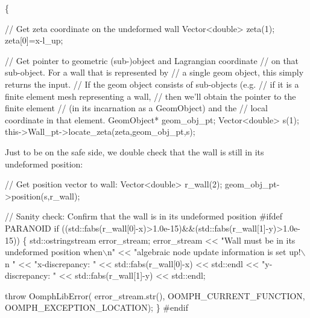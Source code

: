 \begin{DoxyCodeInclude}
    \{

     \textcolor{comment}{// Get zeta coordinate on the undeformed wall}
     Vector<double> zeta(1);
     zeta[0]=x-l\_up;

     \textcolor{comment}{// Get pointer to geometric (sub-)object and Lagrangian coordinate}
     \textcolor{comment}{// on that sub-object. For a wall that is represented by }
     \textcolor{comment}{// a single geom object, this simply returns the input.}
     \textcolor{comment}{// If the geom object consists of sub-objects (e.g. }
     \textcolor{comment}{// if it is a finite element mesh representing a wall,}
     \textcolor{comment}{// then we'll obtain the pointer to the finite element}
     \textcolor{comment}{// (in its incarnation as a GeomObject) and the}
     \textcolor{comment}{// local coordinate in that element.}
     GeomObject* geom\_obj\_pt;
     Vector<double> s(1);
     this->Wall\_pt->locate\_zeta(zeta,geom\_obj\_pt,s);

\end{DoxyCodeInclude}


Just to be on the safe side, we double check that the wall is still in its undeformed position\+:


\begin{DoxyCodeInclude}

     \textcolor{comment}{// Get position vector to wall:}
     Vector<double> r\_wall(2);
     geom\_obj\_pt->position(s,r\_wall);

     \textcolor{comment}{// Sanity check: Confirm that the wall is in its undeformed position}
\textcolor{preprocessor}{#ifdef PARANOID}
     \textcolor{keywordflow}{if} ((std::fabs(r\_wall[0]-x)>1.0e-15)&&(std::fabs(r\_wall[1]-y)>1.0e-15))
      \{
       std::ostringstream error\_stream;
       error\_stream 
        << \textcolor{stringliteral}{"Wall must be in its undeformed position when\(\backslash\)n"}
        << \textcolor{stringliteral}{"algebraic node update information is set up!\(\backslash\)n "}
        << \textcolor{stringliteral}{"x-discrepancy: "} << std::fabs(r\_wall[0]-x) << std::endl
        << \textcolor{stringliteral}{"y-discrepancy: "} << std::fabs(r\_wall[1]-y) << std::endl;
       
       \textcolor{keywordflow}{throw} OomphLibError(
        error\_stream.str(),
        OOMPH\_CURRENT\_FUNCTION,
        OOMPH\_EXCEPTION\_LOCATION);
      \}
\textcolor{preprocessor}{#endif }

\end{DoxyCodeInclude}


